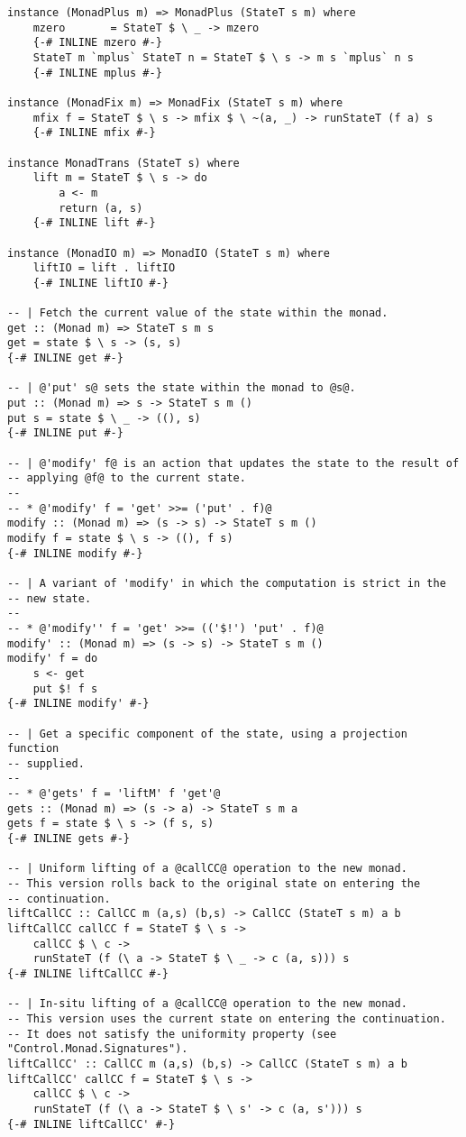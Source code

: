 \begin{multicols}{2}
\begin{lstlisting}
instance (MonadPlus m) => MonadPlus (StateT s m) where
    mzero       = StateT $ \ _ -> mzero
    {-# INLINE mzero #-}
    StateT m `mplus` StateT n = StateT $ \ s -> m s `mplus` n s
    {-# INLINE mplus #-}

instance (MonadFix m) => MonadFix (StateT s m) where
    mfix f = StateT $ \ s -> mfix $ \ ~(a, _) -> runStateT (f a) s
    {-# INLINE mfix #-}

instance MonadTrans (StateT s) where
    lift m = StateT $ \ s -> do
        a <- m
        return (a, s)
    {-# INLINE lift #-}

instance (MonadIO m) => MonadIO (StateT s m) where
    liftIO = lift . liftIO
    {-# INLINE liftIO #-}

-- | Fetch the current value of the state within the monad.
get :: (Monad m) => StateT s m s
get = state $ \ s -> (s, s)
{-# INLINE get #-}

-- | @'put' s@ sets the state within the monad to @s@.
put :: (Monad m) => s -> StateT s m ()
put s = state $ \ _ -> ((), s)
{-# INLINE put #-}

-- | @'modify' f@ is an action that updates the state to the result of
-- applying @f@ to the current state.
--
-- * @'modify' f = 'get' >>= ('put' . f)@
modify :: (Monad m) => (s -> s) -> StateT s m ()
modify f = state $ \ s -> ((), f s)
{-# INLINE modify #-}

-- | A variant of 'modify' in which the computation is strict in the
-- new state.
--
-- * @'modify'' f = 'get' >>= (('$!') 'put' . f)@
modify' :: (Monad m) => (s -> s) -> StateT s m ()
modify' f = do
    s <- get
    put $! f s
{-# INLINE modify' #-}

-- | Get a specific component of the state, using a projection function
-- supplied.
--
-- * @'gets' f = 'liftM' f 'get'@
gets :: (Monad m) => (s -> a) -> StateT s m a
gets f = state $ \ s -> (f s, s)
{-# INLINE gets #-}

-- | Uniform lifting of a @callCC@ operation to the new monad.
-- This version rolls back to the original state on entering the
-- continuation.
liftCallCC :: CallCC m (a,s) (b,s) -> CallCC (StateT s m) a b
liftCallCC callCC f = StateT $ \ s ->
    callCC $ \ c ->
    runStateT (f (\ a -> StateT $ \ _ -> c (a, s))) s
{-# INLINE liftCallCC #-}

-- | In-situ lifting of a @callCC@ operation to the new monad.
-- This version uses the current state on entering the continuation.
-- It does not satisfy the uniformity property (see "Control.Monad.Signatures").
liftCallCC' :: CallCC m (a,s) (b,s) -> CallCC (StateT s m) a b
liftCallCC' callCC f = StateT $ \ s ->
    callCC $ \ c ->
    runStateT (f (\ a -> StateT $ \ s' -> c (a, s'))) s
{-# INLINE liftCallCC' #-}


\end{lstlisting}
\end{multicols}
